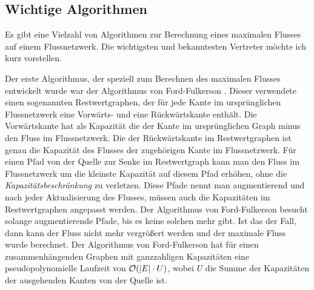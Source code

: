 \begin{center}
\end{center}

\subsection{Wichtige Algorithmen}

Es gibt eine Vielzahl von Algorithmen zur Berechnung eines maximalen Flusses auf einem Flussnetzwerk. Die wichtigsten und bekanntesten Vertreter möchte ich kurz vorstellen. 

Der erste Algorithmus, der speziell zum Berechnen des maximalen Flusses entwickelt wurde war der Algorithmus von Ford-Fulkerson \cite{gt14}. Dieser verwendete einen sogenannten Restwertgraphen, der für jede Kante im ursprünglichen Flussnetzwerk eine Vorwärts- und eine Rückwärtskante enthält. Die Vorwärtskante hat als Kapazität die der Kante im ursprünglichen Graph minus den Fluss im Flussnetzwerk. Die der Rückwärtskante im Restwertgraphen ist genau die Kapazität des Flusses der zugehörigen Kante im Flussnetzwerk. Für einen Pfad von der Quelle zur Senke im Restwertgraph kann man den Fluss im Flussnetzwerk um die kleinste Kapazität auf diesem Pfad erhöhen, ohne die \emph{Kapazitätsbeschränkung} zu verletzen. Diese Pfade nennt man augmentierend und nach jeder Aktualisierung des Flusses, müssen auch die Kapazitäten im Restwertgraphen angepasst werden. Der Algorithmus von Ford-Fulkerson besucht solange augmentierende Pfade, bis es keine solchen mehr gibt. Ist das der Fall, dann kann der Fluss nicht mehr vergrößert werden und der maximale Fluss wurde berechnet. Der Algorithmus von Ford-Fulkerson hat für einen zusammenhängenden Graphen mit ganzzahligen Kapazitäten eine pseudopolynomielle Laufzeit von $\mathcal{O}(|E|\cdot U)$, wobei $U$ die Summe der Kapazitäten der ausgehenden Kanten von der Quelle ist.

